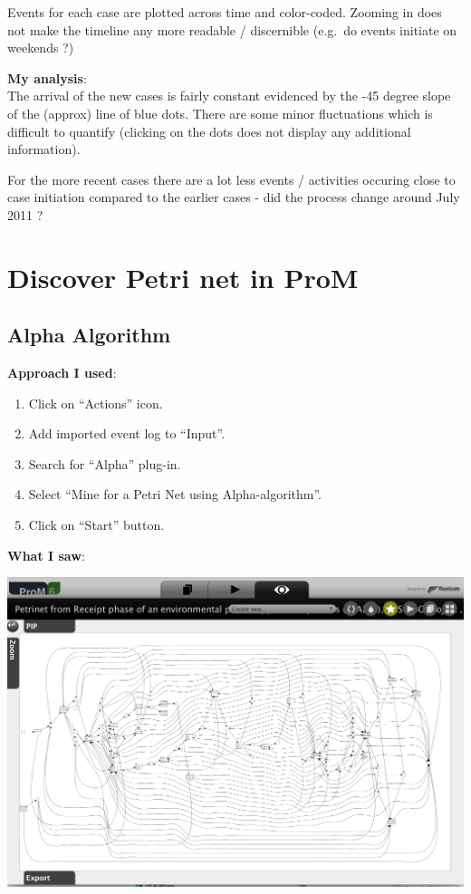 \documentclass[]{article}
\begin{document}
Events for each case are plotted across time and color-coded. Zooming in
does not make the timeline any more readable / discernible (e.g.~do
events initiate on weekends ?)

\textbf{My analysis}:\\The arrival of the new cases is fairly constant
evidenced by the -45 degree slope of the (approx) line of blue dots.
There are some minor fluctuations which is difficult to quantify
(clicking on the dots does not display any additional information).

For the more recent cases there are a lot less events / activities
occuring close to case initiation compared to the earlier cases - did
the process change around July 2011 ?

\section{Discover Petri net in ProM}\label{discover-petri-net-in-prom}

\subsection{Alpha Algorithm}\label{alpha-algorithm}

\textbf{Approach I used}:

\begin{enumerate}
\def\labelenumi{\arabic{enumi}.}
\itemsep1pt\parskip0pt
\item
  Click on ``Actions'' icon.
\item
  Add imported event log to ``Input''.
\item
  Search for ``Alpha'' plug-in.
\item
  Select ``Mine for a Petri Net using Alpha-algorithm''.
\item
  Click on ``Start'' button.
\end{enumerate}

\textbf{What I saw}:

\includegraphics{CoSeLoG_Step_05.png}
\end{document}
